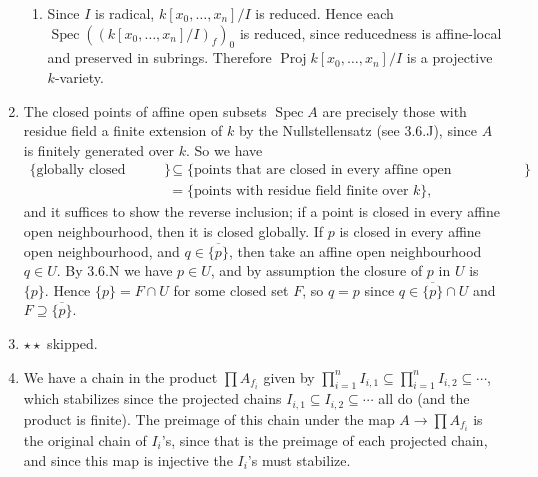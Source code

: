 \documentclass{report}
\newcommand{\closure}[1]{\overline{#1}} %
\DeclareMathOperator{\Spec}{Spec}
\DeclareMathOperator{\Proj}{Proj}
\begin{document}
\begin{enumerate}[label=\textbf{5.3.\Alph*.}]
\begin{enumerate}[label=(\alph*)]
		      \item Since $I$ is radical, $k[x_0,\ldots,x_n]/I$ is reduced. Hence
		            each $\Spec((k[x_0,\ldots,x_n]/I)_f)_0$ is reduced, since
		            reducedness is affine-local and preserved in subrings. Therefore
		            $\Proj k[x_0,\ldots,x_n]/I$ is a projective $k$-variety.
	      \end{enumerate}

	\item The closed points of affine open subsets $\Spec A$ are precisely those
	      with residue field a finite extension of $k$ by the Nullstellensatz (see
	      3.6.J), since $A$ is finitely generated over $k$. So we have
	      \begin{align*}
		      \{\text{globally closed points}\}
		       & \subseteq \{\text{points that are closed in every affine open
		      neighbourhood}\}                                                 \\
		       & = \{\text{points with residue field finite over $k$}\},
	      \end{align*}
	      and it suffices to show the reverse inclusion; if a point is closed in
	      every affine open neighbourhood, then it is closed globally. If $p$ is
	      closed in every affine open neighbourhood, and $q\in\closure{\{p\}}$,
	      then take an affine open neighbourhood $q\in U$. By 3.6.N we have
	      $p\in U$, and by assumption the closure of $p$ in $U$ is $\{p\}$. Hence
	      $\{p\}=F\cap U$ for some closed set $F$, so $q=p$ since
	      $q\in\closure{\{p\}}\cap U$ and $F\supseteq\closure{\{p\}}$.

	\item $\star\star$ skipped.

	\item We have a chain in the product $\prod A_{f_i}$ given by
	      $\prod_{i=1}^nI_{i,1}\subseteq\prod_{i=1}^nI_{i,2}\subseteq\cdots$,
	      which stabilizes since the projected chains
	      $I_{i,1}\subseteq I_{i,2}\subseteq\cdots$ all do (and the product is
	      finite). The preimage of this chain under the map $A\to\prod A_{f_i}$ is
	      the original chain of $I_i$'s, since that is the preimage of each
	      projected chain, and since this map is injective the $I_i$'s must
	      stabilize.


\end{enumerate}
\end{document}
